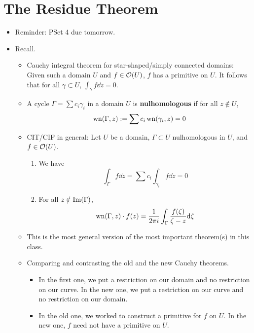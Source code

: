 \documentclass[../notes.tex]{subfiles}
\begin{document}
\section{The Residue Theorem}
\begin{itemize}
    \item {}Reminder: PSet 4 due tomorrow.
    \item Recall.
    \begin{itemize}
        \item Cauchy integral theorem for star-shaped/simply connected domains: Given such a domain $U$ and $f\in\mathcal{O}(U)$, $f$ has a primitive on $U$. It follows that for all $\gamma\subset U$, $\int_\gamma f\dd{z}=0$.
        \item A cycle $\Gamma=\sum c_i\gamma_i$ in a domain $U$ is \textbf{nulhomologous} if for all $z\notin U$,
        \begin{equation*}
            \operatorname{wn}(\Gamma,z) := \sum c_i\operatorname{wn}(\gamma_i,z)
            = 0
        \end{equation*}
        \item CIT/CIF in general: Let $U$ be a domain, $\Gamma\subset U$ nulhomologous in $U$, and $f\in\mathcal{O}(U)$.
        \begin{enumerate}
            \item We have
            \begin{equation*}
                \int_\Gamma f\dd{z} = \sum c_i\int_{\gamma_i}f\dd{z}
                = 0
            \end{equation*}
            \item For all $z\notin\operatorname{Im}(\Gamma)$,
            \begin{equation*}
                \operatorname{wn}(\Gamma,z)\cdot f(z) = \frac{1}{2\pi i}\int_\Gamma\frac{f(\zeta)}{\zeta-z}\dd\zeta
            \end{equation*}
        \end{enumerate}
        \item This is the most general version of the most important theorem(s) in this class.
        \item Comparing and contrasting the old and the new Cauchy theorems.
        \begin{itemize}
            \item In the first one, we put a restriction on our domain and no restriction on our curve. In the new one, we put a restriction on our curve and no restriction on our domain.
            \item In the old one, we worked to construct a primitive for $f$ on $U$. In the new one, $f$ need not have a primitive on $U$.

\end{itemize}
\end{itemize}
\end{itemize}
\end{document}
